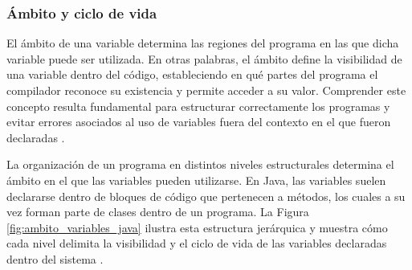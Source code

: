 \documentclass[12pt,twoside]{book}
\begin{document}
					\subsubsection{Ámbito y ciclo de vida}
						\noindent						
						El ámbito de una variable determina las regiones del programa en las que dicha variable puede ser utilizada. En otras palabras, el ámbito define la visibilidad de una variable dentro del código, estableciendo en qué partes del programa el compilador reconoce su existencia y permite acceder a su valor. Comprender este concepto resulta fundamental para estructurar correctamente los programas y evitar errores asociados al uso de variables fuera del contexto en el que fueron declaradas \cite{Sebesta2018Concepts,Pierce2002Types}.
						
						La organización de un programa en distintos niveles estructurales determina el ámbito en el que las variables pueden utilizarse. En Java, las variables suelen declararse dentro de bloques de código que pertenecen a métodos, los cuales a su vez forman parte de clases dentro de un programa. La Figura \ref{fig:ambito_variables_java} ilustra esta estructura jerárquica y muestra cómo cada nivel delimita la visibilidad y el ciclo de vida de las variables declaradas dentro del sistema \cite{Sebesta2018Concepts,Pierce2002Types}.
						
\end{document}
